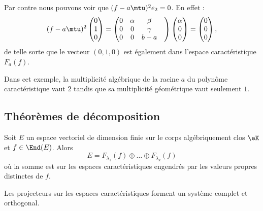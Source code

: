 \begin{remark}
	Par contre nous pouvons voir que \( (f-a\mtu)^2e_2=0\). En effet :
	\begin{equation}
		(f-a\mtu)^2\begin{pmatrix}
			0 \\
			1 \\
			0
		\end{pmatrix}=\begin{pmatrix}
			0 & \alpha & \beta    \\
			0 & 0      & \gamma   \\
			0 & 0      & b-a    &
		\end{pmatrix}\begin{pmatrix}
			\alpha \\
			0      \\
			0
		\end{pmatrix}=\begin{pmatrix}
			0 \\
			0 \\
			0
		\end{pmatrix},
	\end{equation}
	de telle sorte que le vecteur \( (0,1,0)\) est également dans l'espace caractéristique \( F_a(f)\).

	Dans cet exemple, la multiplicité algébrique de la racine \( a\) du polynôme caractéristique vaut \( 2\) tandis que sa multiplicité géométrique vaut seulement \( 1\).
\end{remark}

\subsection{Théorèmes de décomposition}

\begin{theorem}     \label{ThoSpectraluRMLok}
	Soit \( E\) un espace vectoriel de dimension finie sur le corps algébriquement clos \( \eK\) et \( f\in\End(E)\). Alors
	\begin{equation}    \label{EqCTFHooBSGhYK}
		E=F_{\lambda_1}(f)\oplus\ldots\oplus F_{\lambda_k}(f)
	\end{equation}
	où la somme est sur les espaces caractéristiques engendrés par les valeurs propres distinctes de \( f\).

	Les projecteurs sur les espaces caractéristiques forment un système complet et orthogonal.
\end{theorem}

